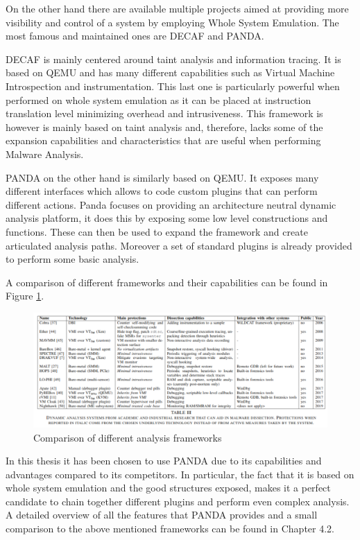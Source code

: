 On the other hand there are available multiple projects aimed at providing more visibility and control of a system by employing Whole System Emulation. The most famous and maintained ones are DECAF\cite{decaf} and PANDA\cite{panda}. 

DECAF is mainly centered around taint analysis and information tracing. It is based on QEMU and has many different capabilities such as Virtual Machine Introspection and instrumentation. This last one is particularly powerful when performed on whole system emulation as it can be placed at instruction translation level minimizing overhead and intrusiveness. This framework is however is mainly based on taint analysis and, therefore, lacks some of the expansion capabilities and characteristics that are useful when performing Malware Analysis. 

PANDA on the other hand is similarly based on QEMU. It exposes many different interfaces which allows to code custom plugins that can perform different actions. Panda focuses on providing an architecture neutral dynamic analysis platform, it does this by exposing some low level constructions and functions. These can then be used to expand the framework and create articulated analysis paths. Moreover a set of standard plugins is already provided to perform some basic analysis.

A comparison of different frameworks and their capabilities can be found in Figure \ref{fig:frcmp}.

\begin{figure}[htp]
\centering
\includegraphics[width=\linewidth]{images/framcomp.png}
\caption{Comparison of different analysis frameworks ~\cite{9018111}}
\label{fig:frcmp}
\end{figure}

In this thesis it has been chosen to use PANDA due to its capabilities and advantages compared to its competitors. In particular, the fact that it is based on whole system emulation and the good structures exposed, makes it a perfect candidate to chain together different plugins and perform even complex analysis. A detailed overview of all the features that PANDA provides and a small comparison to the above mentioned frameworks can be found in Chapter 4.2.